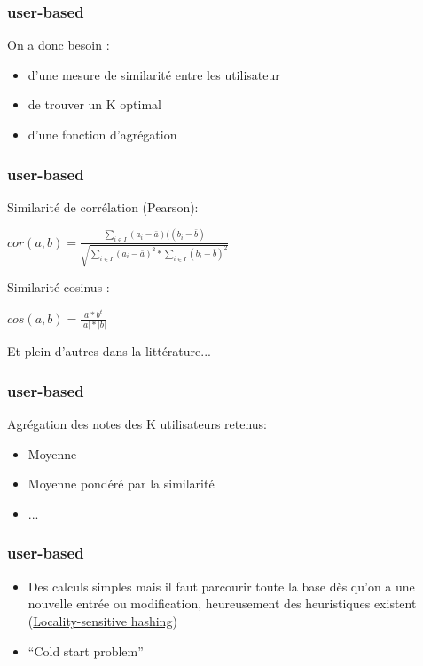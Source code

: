 \begin{frame}
  \frametitle{user-based}
  On a donc besoin :
  \begin{itemize}
  \item d'une mesure de similarité entre les utilisateur
  \item de trouver un K optimal
  \item d'une fonction d'agrégation
  \end{itemize}
\end{frame}

\begin{frame}
  \frametitle{user-based}
  Similarité de corrélation (Pearson):\\
  \begin{center}
    $cor(a,b)=\frac{ \sum_{i \in I} (a_i - \bar{a})((b_i - \bar{b})}{\sqrt{\sum_{i \in I} (a_i - \bar{a})^2*\sum_{i \in I} (b_i - \bar{b})^2}}$ \\
  \end{center}
  Similarité cosinus :\\
  \begin{center}
    $cos(a,b)=\frac{a*b^t}{|a|*|b|}$
  \end{center}
  Et plein d'autres dans la littérature...
\end{frame}

\begin{frame}
  \frametitle{user-based}
  Agrégation des notes des K utilisateurs retenus:
  \begin{itemize}
  \item Moyenne
  \item Moyenne pondéré par la similarité
  \item ...
  \end{itemize}
\end{frame}

\begin{frame}
  \frametitle{user-based}
  \begin{itemize}[<+->]
  \item Des calculs simples mais il faut parcourir toute la base dès qu'on a une nouvelle entrée ou modification, heureusement des heuristiques existent (\href{https://en.wikipedia.org/wiki/Locality-sensitive_hashing}{Locality-sensitive hashing})
  \item ``Cold start problem''
  \end{itemize}
\end{frame}
